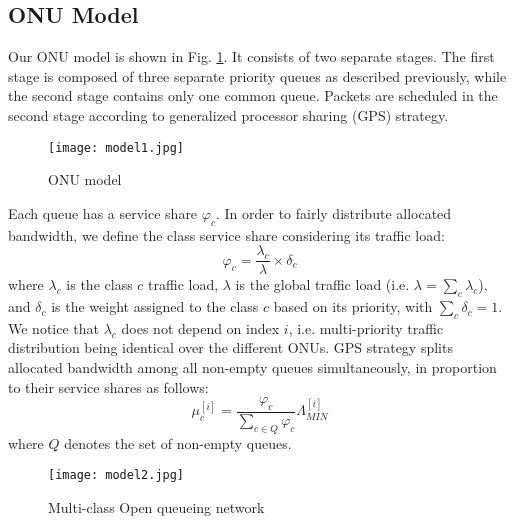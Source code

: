 \documentclass[a4paper,10pt]{IEEEtran}
\begin{document}
\subsection{ONU Model}
Our ONU model is shown in Fig. \ref{onu-model1}. It consists of two
separate stages. The first stage is composed of three separate
priority queues as described previously, while the second stage
contains only one common queue. Packets are scheduled in the second
stage according to generalized processor sharing (GPS) strategy.
\begin{figure}[!h]
\centering
\texttt{[image: model1.jpg]}
\caption{ONU model} \label{onu-model1}
\end{figure}

Each queue has a service share $\varphi_{c}$. In order to fairly
distribute allocated bandwidth, we define the class service share
considering its traffic load:
\begin{equation}
\varphi_{c} = \frac{\lambda_{c}}{\lambda} \times \delta_{c}
\end{equation}
where $\lambda_c$ is the class $c$ traffic load, $\lambda$ is the
global traffic load (i.e. $\lambda = \sum_{c} \lambda_c$), and
$\delta_{c}$ is the weight assigned to the class $c$ based on its
priority, with $\sum_{c} \delta_{c} = 1$. We notice that
$\lambda_{c}$ does not depend on index $i$, i.e. multi-priority
traffic distribution being identical over the different ONUs. GPS
strategy splits allocated bandwidth among all non-empty queues
simultaneously, in proportion to their service shares as follows:
\begin{equation}
\mu_{c}^{[i]} = \frac{\varphi_{c}}{\sum_{c \in Q} \varphi_{c}}
\Lambda_{MIN}^{[i]}
\end{equation}
where $Q$ denotes the set of non-empty queues.
\begin{figure}[!h]
\centering
\texttt{[image: model2.jpg]}
\caption{Multi-class Open queueing network} \label{onu-model2}
\end{figure}
\end{document}
